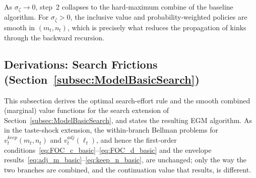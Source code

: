 As $\sigma_\zeta\to 0$, step~2 collapses to the hard-maximum combine of the baseline algorithm. For $\sigma_\zeta>0$, the inclusive value and probability-weighted policies are smooth in $(m_t,n_t)$, which is precisely what reduces the propagation of kinks through the backward recursion.


\subsection{Derivations: Search Frictions (Section~\ref{subsec:ModelBasicSearch})}\label{subsec:appdx_search_basic}

This subsection derives the optimal search-effort rule and the smooth combined (marginal) value functions for the search extension of Section~\ref{subsec:ModelBasicSearch}, and states the resulting EGM algorithm. As in the taste-shock extension, the within-branch Bellman problems for $v_t^{keep}(m_t,n_t)$ and $v_t^{adj}(\ell_t)$, and hence the first-order conditions~\eqref{eq:FOC_c_basic}--\eqref{eq:FOC_d_basic} and the envelope results~\eqref{eq:adj_m_basic}--\eqref{eq:keep_n_basic}, are unchanged; only the way the two branches are combined, and the continuation value that results, is different.

